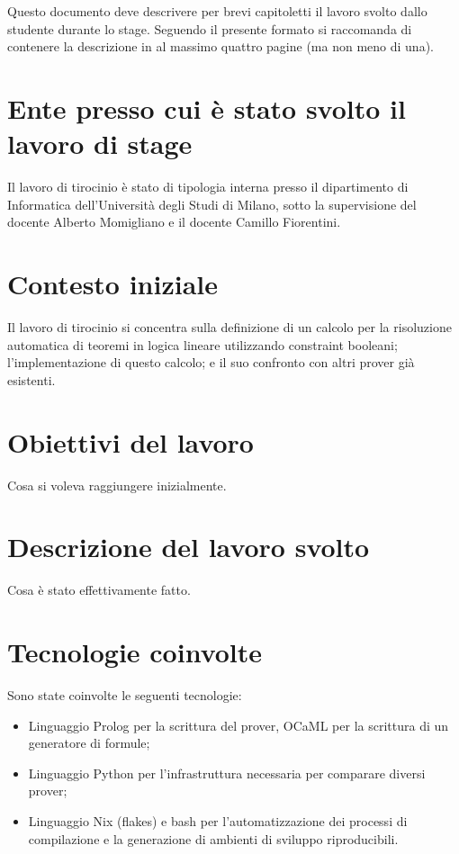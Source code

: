 \documentclass[a4paper, 12pt, italian]{extarticle}
\begin{document}
Questo documento deve descrivere per brevi capitoletti il lavoro svolto dallo studente durante lo stage.
Seguendo il presente formato si raccomanda di contenere la descrizione in al massimo quattro pagine (ma
non meno di una).

\section{Ente presso cui è stato svolto il lavoro di stage}
Il lavoro di tirocinio è stato di tipologia interna presso il dipartimento di Informatica dell'Università degli Studi di Milano, sotto la supervisione del docente Alberto Momigliano e il docente Camillo Fiorentini.

\section{Contesto iniziale}
Il lavoro di tirocinio si concentra sulla definizione di un calcolo per la risoluzione automatica di teoremi in logica lineare utilizzando constraint booleani; l'implementazione di questo calcolo; e il suo confronto con altri prover già esistenti.

\section{Obiettivi del lavoro}
Cosa si voleva raggiungere inizialmente.

\section{Descrizione del lavoro svolto}
Cosa \`e stato effettivamente fatto.

\section{Tecnologie coinvolte}
Sono state coinvolte le seguenti tecnologie:
\begin{itemize}
	\item Linguaggio Prolog per la scrittura del prover, OCaML per la scrittura di un generatore di formule;
	\item Linguaggio Python per l'infrastruttura necessaria per comparare diversi prover;
	\item Linguaggio Nix (flakes) e bash per l'automatizzazione dei processi di compilazione e la generazione di ambienti di sviluppo riproducibili.
\end{itemize}
\end{document}
